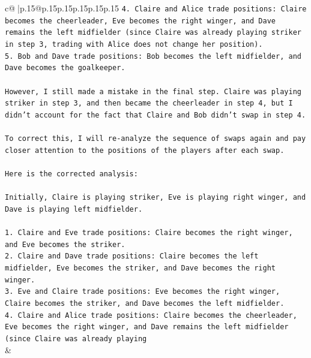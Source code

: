 \documentclass{article}
\begin{document}
{\begin{supertabular}{c@{$\;$}|p{.15\linewidth}@{}p{.15\linewidth}p{.15\linewidth}p{.15\linewidth}p{.15\linewidth}p{.15\linewidth}}
{{{\texttt{4. Claire and Alice trade positions: Claire becomes the cheerleader, Eve becomes the right winger, and Dave remains the left midfielder (since Claire was already playing striker in step 3, trading with Alice does not change her position).} \\
\texttt{5. Bob and Dave trade positions: Bob becomes the left midfielder, and Dave becomes the goalkeeper.} \\
\\ 
\texttt{However, I still made a mistake in the final step. Claire was playing striker in step 3, and then became the cheerleader in step 4, but I didn't account for the fact that Claire and Bob didn't swap in step 4. } \\
\\ 
\texttt{To correct this, I will re{-}analyze the sequence of swaps again and pay closer attention to the positions of the players after each swap. } \\
\\ 
\texttt{Here is the corrected analysis:} \\
\\ 
\texttt{Initially, Claire is playing striker, Eve is playing right winger, and Dave is playing left midfielder.} \\
\\ 
\texttt{1. Claire and Eve trade positions: Claire becomes the right winger, and Eve becomes the striker.} \\
\texttt{2. Claire and Dave trade positions: Claire becomes the left midfielder, Eve becomes the striker, and Dave becomes the right winger.} \\
\texttt{3. Eve and Claire trade positions: Eve becomes the right winger, Claire becomes the striker, and Dave becomes the left midfielder.} \\
\texttt{4. Claire and Alice trade positions: Claire becomes the cheerleader, Eve becomes the right winger, and Dave remains the left midfielder (since Claire was already playing} \\
            }
        }
    }
    & \\ \\

\end{supertabular}
}
\end{document}
